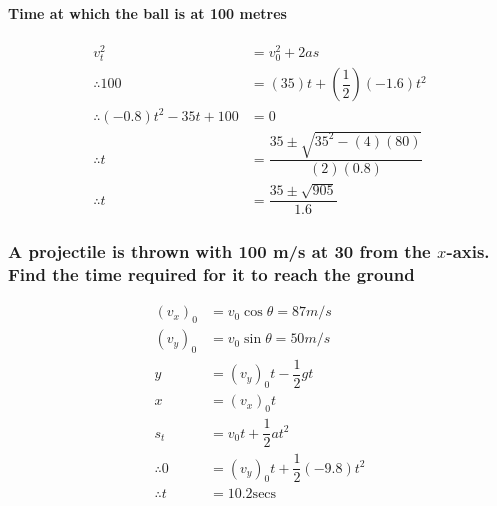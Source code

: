 \documentclass[fleqn]{article}
\begin{document}
\paragraph{Time at which the ball is at 100 metres}

\begin{align*}
	v_t^2 &= v_0^2 + 2 a s \\
	\therefore 100 &= (35)t + (\dfrac{1}{2})(-1.6)t^2\\
	\therefore (-0.8)t^2 - 35t + 100 &= 0 \\
	\therefore t &= \dfrac{35 \pm \sqrt{35^2 -(4)(80)}}{(2)(0.8)} \\
	\therefore t &= \dfrac{35 \pm \sqrt{905}}{1.6}
\end{align*}

\subsubsection{A projectile is thrown with 100 m/s at 30 \degree from the $x$-axis. Find the time required for it to reach the ground}

\begin{align*}
	(v_x)_0 &= v_0 \cos \theta = 87 { m/s}\\
	(v_y)_0 &= v_0 \sin \theta = 50 { m/s}\\
	y &= (v_y)_0 t - \dfrac{1}{2} g t\\
	x &= (v_x)_0 t \\
	s_t &= v_0 t + \dfrac{1}{2} a t^2 \\
	\therefore 0 &= (v_y)_0 t + \dfrac{1}{2}(-9.8) t^2\\
	\therefore t &= 10.2 \text{secs}
\end{align*}
\end{document}
